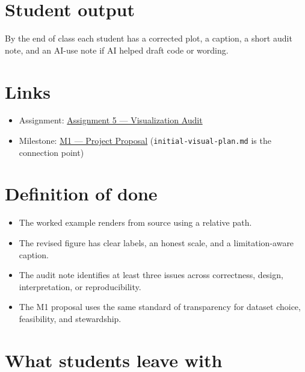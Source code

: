 \documentclass[
  letterpaper,
  DIV=11,
  numbers=noendperiod,
  oneside]{scrreprt}
\providecommand{\tightlist}{%
  \setlength{\itemsep}{0pt}\setlength{\parskip}{0pt}}
\begin{document}
\section*{Student output}\label{student-output-3}


By the end of class each student has a corrected plot, a caption, a
short audit note, and an AI-use note if AI helped draft code or wording.

\section*{Links}\label{links}


\begin{itemize}
\tightlist
\item
  Assignment:
  \href{../../assignments/assignment05-visualization/README.md}{Assignment
  5 --- Visualization Audit}
\item
  Milestone: \href{../../milestones/m1-proposal/README.md}{M1 ---
  Project Proposal} (\texttt{initial-visual-plan.md} is the connection
  point)
\end{itemize}

\section*{Definition of done}\label{definition-of-done-2}


\begin{itemize}
\tightlist
\item
  The worked example renders from source using a relative path.
\item
  The revised figure has clear labels, an honest scale, and a
  limitation-aware caption.
\item
  The audit note identifies at least three issues across correctness,
  design, interpretation, or reproducibility.
\item
  The M1 proposal uses the same standard of transparency for dataset
  choice, feasibility, and stewardship.
\end{itemize}

\section*{What students leave with}\label{what-students-leave-with-1}
\end{document}
